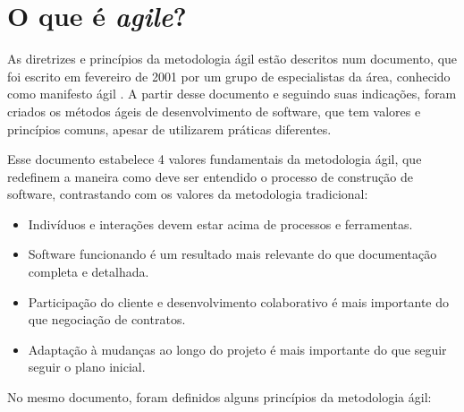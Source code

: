 \section {O que é \textit{agile}?}

As diretrizes e princípios da metodologia ágil estão descritos num documento, que foi escrito em fevereiro de 2001 por um grupo de especialistas da área, conhecido como manifesto ágil . A partir desse documento e seguindo suas indicações, foram criados os métodos ágeis de desenvolvimento de software, que tem valores e princípios comuns, apesar de utilizarem práticas diferentes.

Esse documento estabelece 4 valores fundamentais da metodologia ágil, que redefinem a maneira como deve ser entendido o processo de construção de software, contrastando com os valores da metodologia tradicional:

\begin{itemize}
\item Indivíduos e interações devem estar acima de processos e ferramentas. 
\item Software funcionando é um resultado mais relevante do que documentação completa e detalhada.
\item Participação do cliente e desenvolvimento colaborativo é mais importante do que negociação de contratos.
\item Adaptação à mudanças ao longo do projeto é mais importante do que seguir seguir o plano inicial.
\end{itemize}

No mesmo documento, foram definidos alguns princípios da metodologia ágil:

